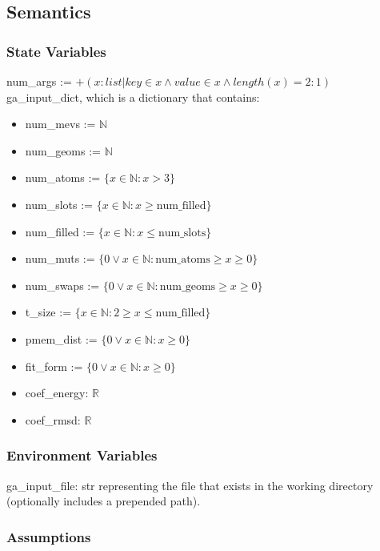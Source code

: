 \documentclass[12pt, titlepage]{article}
\begin{document}
\subsection{Semantics}

\subsubsection{State Variables}

\noindent num\_args := $+(x : list | key \in x \land value \in x \land 
length(x) = 2 : 1)$ \\

\noindent ga\_input\_dict, which is a dictionary that contains:
\begin{itemize}
\item num\_mevs := $\mathbb{N}$
\item num\_geoms := $\mathbb{N}$
\item num\_atoms := $\{x \in \mathbb{N}: x > 3\}$
\item num\_slots := $\{x \in \mathbb{N}: x \geq \text{num\_filled} \}$
\item num\_filled := $\{x \in \mathbb{N}: x \leq \text{num\_slots}\}$
\item num\_muts := $\{0 \lor x \in \mathbb{N}: \text{num\_atoms} \geq x \geq 
0\}$
\item num\_swaps := $\{0 \lor x \in \mathbb{N}: \text{num\_geoms} \geq x \geq 
0\}$
\item t\_size := $\{x \in \mathbb{N}: 2 \geq x \leq \text{num\_filled} \}$
\item pmem\_dist := $\{0 \lor x \in \mathbb{N}: x \geq 0\}$
\item fit\_form := $\{0 \lor x \in \mathbb{N}: x \geq 0\}$
\item coef\_energy: $\mathbb{R}$
\item coef\_rmsd: $\mathbb{R}$
\end{itemize}

\subsubsection{Environment Variables}

ga\_input\_file: str representing the file that exists in the working directory 
(optionally includes a prepended path).

\subsubsection{Assumptions}
\end{document}
